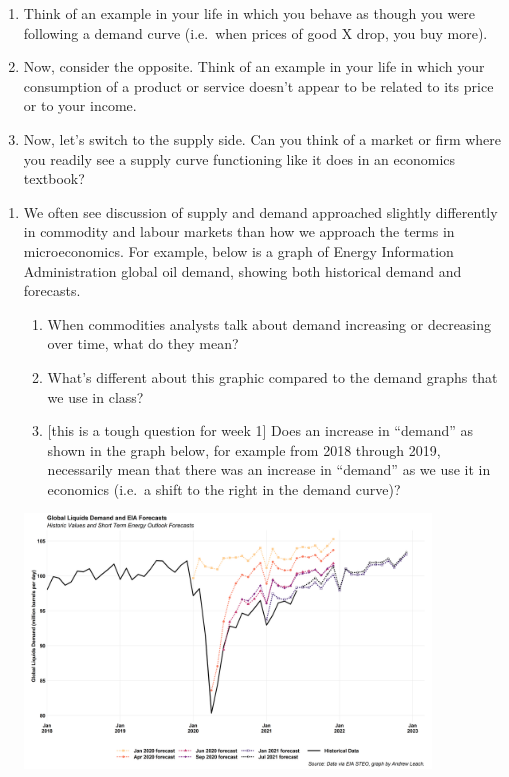\documentclass[11pt,]{article}
\providecommand{\tightlist}{%
  \setlength{\itemsep}{0pt}\setlength{\parskip}{0pt}}
\begin{document}
\begin{enumerate}
\def\labelenumi{\arabic{enumi}.}
\setcounter{enumi}{1}
\item
  Think of an example in your life in which you behave as though you
  were following a demand curve (i.e.~when prices of good X drop, you
  buy more).
\item
  Now, consider the opposite. Think of an example in your life in which
  your consumption of a product or service doesn't appear to be related
  to its price or to your income.
\item
  Now, let's switch to the supply side. Can you think of a market or
  firm where you readily see a supply curve functioning like it does in
  an economics textbook?
\end{enumerate}

\newpage

\begin{enumerate}
\def\labelenumi{\arabic{enumi}.}
\setcounter{enumi}{4}
\item
  We often see discussion of supply and demand approached slightly
  differently in commodity and labour markets than how we approach the
  terms in microeconomics. For example, below is a graph of Energy
  Information Administration global oil demand, showing both historical
  demand and forecasts.

  \begin{enumerate}
  \def\labelenumii{\alph{enumii})}
  \tightlist
  \item
    When commodities analysts talk about demand increasing or decreasing
    over time, what do they mean?
  \item
    What's different about this graphic compared to the demand graphs
    that we use in class?
  \item
    {[}this is a tough question for week 1{]} Does an increase in
    ``demand'' as shown in the graph below, for example from 2018
    through 2019, necessarily mean that there was an increase in
    ``demand'' as we use it in economics (i.e.~a shift to the right in
    the demand curve)?
  \end{enumerate}

  \centering

  \includegraphics[width=0.85\textwidth]{../images/demand.png}
\end{enumerate}
\end{document}
